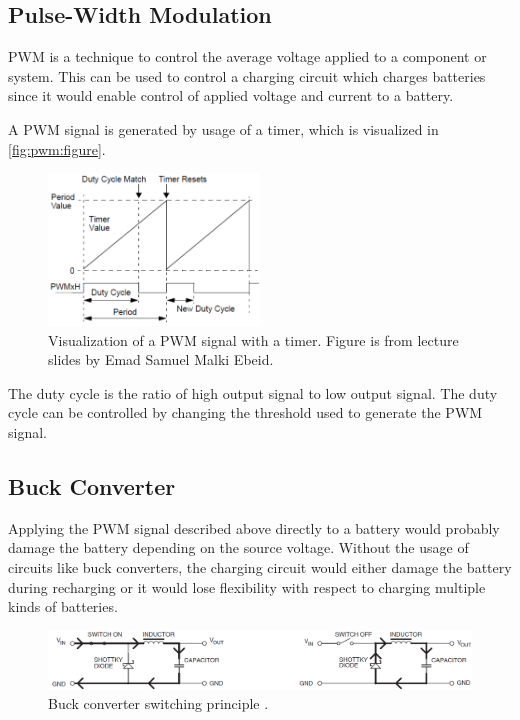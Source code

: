 \documentclass[../report.tex]{subfiles}
\begin{document}
\subsection{Pulse-Width Modulation}
PWM is a technique to control the average voltage applied to a component or system. This can be used to control a charging circuit which charges batteries since it would enable control of applied voltage and current to a battery.

A PWM signal is generated by usage of a timer, which is visualized in \autoref{fig:pwm:figure}.

\begin{figure}[H]
    \centering
    \includegraphics[width=0.5\textwidth]{figures/pwm/pwm_fig.png}
    \captionsetup{width=0.75\textwidth}
    \caption{Visualization of a PWM signal with a timer. Figure is from lecture slides by Emad Samuel Malki Ebeid.}
    \label{fig:pwm:figure}
\end{figure}

The duty cycle is the ratio of high output signal to low output signal. The duty cycle can be controlled by changing the threshold used to generate the PWM signal.

\subsection{Buck Converter}
Applying the PWM signal described above directly to a battery would probably damage the battery depending on the source voltage. Without the usage of circuits like buck converters, the charging circuit would either damage the battery during recharging or it would lose flexibility with respect to charging multiple kinds of batteries.

\begin{figure}[H]
    \centering
    \includegraphics[width=1\textwidth]{figures/buck_converter_principle.png}
    \caption{Buck converter switching principle \cite{avr450}.}
    \label{fig:buck:principle}
\end{figure}
\end{document}
